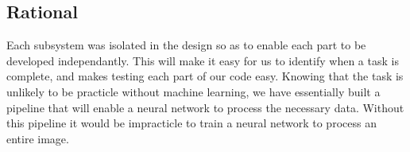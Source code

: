 \subsection{Rational}

Each subsystem was isolated in the design so as to enable each part to be developed independantly. This will make it easy for us to identify when a task is complete, and makes testing each part of our code easy. 
Knowing that the task is unlikely to be practicle without machine learning, we have essentially built a pipeline that will enable a neural network to process the necessary data. Without this pipeline it would be impracticle to train a neural network to process an entire image.
 
